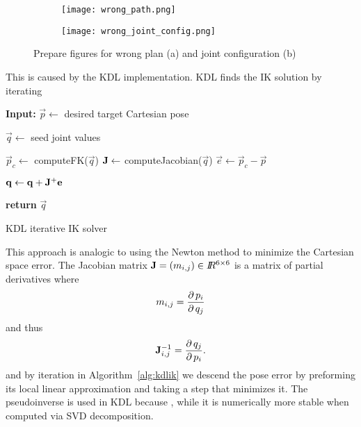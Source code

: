\documentclass[buriama8_dp.tex]{subfiles}
\begin{document}
\begin{figure}[htp]
  \centering
  \begin{subfigure}[t]{0.49\textwidth}
    \texttt{[image: wrong\_path.png]}
    \caption{}
    \label{fig:wron_plan}
  \end{subfigure}
  \begin{subfigure}[t]{0.49\textwidth}
    \texttt{[image: wrong\_joint\_config.png]}
    \caption{}
    \label{fig:wrong_joint}
  \end{subfigure}

  \caption{Prepare figures for wrong plan (a) and joint configuration (b)}
  \label{fig:wrong_planning}
\end{figure}

This is caused by the KDL implementation. KDL finds the IK solution by iterating

\begin{algorithm}[ht]
\begin{algorithmic}
  \State \textbf{Input:} \(\vec p \gets\) desired target Cartesian pose
  \vspace{1em}

  \State \(\vec q \gets\) seed joint values
 
  \Do
    \State \(\vec p_c \gets\) computeFK(\(\vec q\))
    \State \(\mathbf{J} \gets\) computeJacobian(\(\vec q\))
    \State \(\vec e \gets \vec p_c - \vec p\)

    \State \(\mathbf{q} \gets \mathbf{q} + \mathbf{J}^+ \mathbf{e} \)

  \vspace{1em}
  \State \textbf{return} \(\vec q\)
\end{algorithmic}
\caption{KDL iterative IK solver}
\label{alg:kdlik}
\end{algorithm}

This approach is analogic to using the Newton method to minimize the Cartesian space error. The Jacobian matrix \(\mathbf{J} = (m_{i,j}) \in I\!\!R^{6 \times 6} \) is a matrix of partial derivatives where
\[
m_{i,j} = \frac{\partial\,{p_i}}{\partial\, q_j}
\label{eq:jacob}
\]
and thus
\[
\mathbf{J}_{i,j}^{-1} = \frac{\partial\,{q_j}}{\partial\, p_i}.
\]
and by iteration in Algorithm~\ref{alg:kdlik} we descend the pose error by preforming its local linear approximation and taking a step that minimizes it. The pseudoinverse is used in KDL because , while it is numerically more stable when computed via SVD decomposition.
\end{document}
